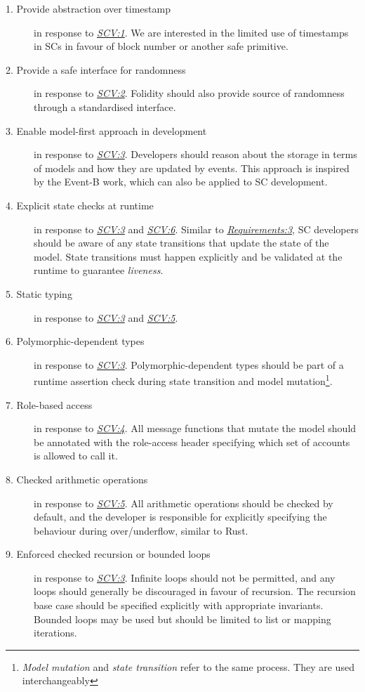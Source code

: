 \documentclass[oneside]{ecsproject}     %
\newcommand{\vref}[1]{\textit{\hyperref[#1]{#1}}}
\newcommand{\rref}[1]{\textit{\hyperref[#1]{#1}}}
\begin{document}
\begin{description}
  \item[1. Provide abstraction over timestamp]\label{Requirements:1} in response to \vref{SCV:1}. We are interested in the limited use of timestamps in SCs in favour of block number or another safe primitive.
  \item[2. Provide a safe interface for randomness]\label{Requirements:2} in response to \vref{SCV:2}. Folidity should also provide source of randomness through a standardised interface.
  \item[3. Enable model-first approach in development]\label{Requirements:3} in response to \vref{SCV:3}. Developers should reason about the storage in terms of models and how they are updated by events. 
This approach is inspired by the Event-B\cite{event_b} work, which can also be applied to SC development.
  \item[4. Explicit state checks at runtime]\label{Requirements:4} in response to \vref{SCV:3} and \vref{SCV:6}. Similar to \rref{Requirements:3}, SC developers should be aware of any state transitions
that update the state of the model. State transitions must happen explicitly and be validated at the runtime to guarantee \textit{liveness}.
  \item[5. Static typing]\label{Requirements:5} in response to \vref{SCV:3} and \vref{SCV:5}.
  \item[6. Polymorphic-dependent types]\label{Requirements:6} in response to \vref{SCV:3}. Polymorphic-dependent types should be part of a runtime assertion check 
during state transition and model mutation\footnote{\textit{Model mutation} and \textit{state transition} refer to the same process. They are used interchangeably}.
  \item[7. Role-based access]\label{Requirements: 7} in response to \vref{SCV:4}. 
All message functions that mutate the model should be annotated with the role-access header specifying which set of accounts is allowed to call it.
  \item[8. Checked arithmetic operations]\label{Requirements:8} in response to \vref{SCV:5}. 
All arithmetic operations should be checked by default, and the developer is responsible for explicitly specifying the behaviour during over/underflow, similar to Rust.
  \item[9. Enforced checked recursion or bounded loops]\label{Requirements:9} in response to \vref{SCV:3}.
Infinite loops should not be permitted, and any loops should generally be discouraged in favour of recursion. The recursion base case should be specified explicitly with appropriate invariants.
Bounded loops may be used but should be limited to list or mapping iterations.
\end{description}
\end{document}
